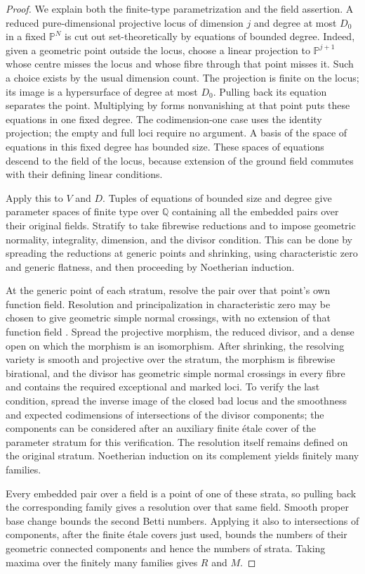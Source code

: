\documentclass[11pt]{article}
\numberwithin{equation}{section}
\theoremstyle{definition}
\newcommand{\Q}{\mathbb Q}
\newcommand{\Pj}{\mathbb P}
\begin{document}
\begin{proof}
We explain both the finite-type parametrization and the field assertion.
A reduced pure-dimensional projective locus of dimension $j$ and
degree at most $D_0$ in a fixed $\Pj^N$ is cut out set-theoretically by
equations of bounded degree. Indeed, given a geometric point outside
the locus, choose a linear projection to $\Pj^{j+1}$ whose centre
misses the locus and whose fibre through that point misses it. Such a
choice exists by the usual dimension count. The projection is finite
on the locus; its image is a hypersurface of degree at most $D_0$.
Pulling back its equation separates the point. Multiplying by forms
nonvanishing at that point puts these equations in one fixed degree.
The codimension-one case uses the identity projection; the empty and
full loci require no argument. A basis of the space of equations in
this fixed degree has bounded size. These spaces of equations descend
to the field of the locus, because extension of the ground field
commutes with their defining linear conditions.

Apply this to $V$ and $D$. Tuples of equations of bounded size and
degree give parameter spaces of finite type over $\Q$ containing all
the embedded pairs over their original fields. Stratify to take
fibrewise reductions and to impose geometric normality, integrality,
dimension, and the divisor condition. This can be done by spreading
the reductions at generic points and shrinking, using characteristic
zero and generic flatness, and then proceeding by Noetherian induction.

At the generic point of each stratum, resolve the pair over that
point's own function field. Resolution and principalization in
characteristic zero may be chosen to give geometric simple normal
crossings, with no extension of that function field
\cite[Theorems~1.3 and~6.1, including the Addendum]{BMT2011}. Spread the projective morphism, the reduced divisor,
and a dense open on which the morphism is an isomorphism. After
shrinking, the resolving variety is smooth and projective over the
stratum, the morphism is fibrewise birational, and the divisor has
geometric simple normal crossings in every fibre and contains the
required exceptional and marked loci. To verify the last condition,
spread the inverse image of the closed bad locus and the smoothness
and expected codimensions of intersections of the divisor components;
the components can be considered after an auxiliary finite étale
cover of the parameter stratum for this verification. The resolution
itself remains defined on the original stratum. Noetherian induction
on its complement yields finitely many families.

Every embedded pair over a field is a point of one of these strata,
so pulling back the corresponding family gives a resolution over that
same field. Smooth proper base change bounds the second Betti numbers.
Applying it also to intersections of components, after the finite
étale covers just used, bounds the numbers of their geometric connected
components and hence the numbers of strata. Taking maxima over the
finitely many families gives $R$ and $M$.
\end{proof}
\end{document}
